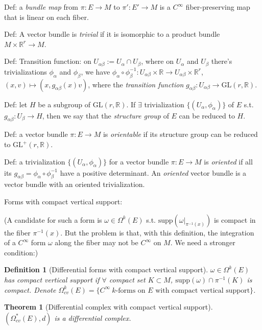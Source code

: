 \documentclass{article}
\theoremstyle{mystyle}
\newtheorem*{definition}{Definition}%
\newtheorem*{theorem*}{Theorem}
\theoremstyle{remark}
\numberwithin{equation}{section}
\begin{document}
Def: a \emph{bundle map} from $\pi\colon E\rightarrow M$ to $\pi'\colon E'\rightarrow M$ is a $C^\infty$ fiber-preserving map that is linear on each fiber.

Def: A vector bundle is \emph{trivial} if it is isomorphic to a product bundle $M\times \mathbb{R}^r\rightarrow M$.

Def: Transition function: on $U_{\alpha\beta} := U_\alpha\cap U_\beta$, where on $U_\alpha$ and $U_\beta$ there's trivializations $\phi_\alpha$ and $\phi_\beta$, we have $\phi_\alpha \circ \phi_\beta^{-1}\colon U_{\alpha\beta}\times \mathbb{R}\rightarrow U_{\alpha\beta} \times \mathbb{R}^r$, $(x,v)\mapsto (x,g_{\alpha\beta}(x)v)$, where the \emph{transition function} $g_{\alpha\beta}\colon U_{\alpha\beta}\rightarrow \mathrm{GL}(r,\mathbb{R})$.

Def: let $H$ be a subgroup of $\mathrm{GL}(r,\mathbb{R})$. If $\exists$ trivialization $\{(U_\alpha,\phi_\alpha)\}$ of $E$ s.t. $g_{\alpha\beta}\colon U_\beta\rightarrow H$, then we say that the \emph{structure group} of $E$ can be reduced to $H$.

Def: a vector bundle $\pi\colon E\rightarrow M$ is \emph{orientable} if its structure group can be reduced to $\mathrm{GL}^+(r,\mathbb{R})$. 

Def: a trivialization $\{(U_\alpha,\phi_\alpha)\}$ for a vector bundle $\pi\colon E\rightarrow M$ is \emph{oriented} if all its $g_{\alpha\beta} = \phi_\alpha \circ \phi_\beta^{-1}$ have a positive determinant. An \emph{oriented} vector bundle is a vector bundle with an oriented trivialization.

Forms with compact vertical support:

(A candidate for such a form is $\omega \in \Omega^k(E)$ s.t. $\text{supp}(\omega|_{\pi^{-1}(x)})$ is compact in the fiber $\pi^{-1}(x)$. But the problem is that, with this definition, the integration of a $C^\infty$ form $\omega$ along the fiber may not be $C^\infty$ on $M$. We need a stronger condition:)

\begin{definition}[Differential forms with compact vertical support] $\omega \in \Omega^k(E)$ has \emph{compact vertical support} if $\forall$ compact set $K\subset M$, $\text{supp}(\omega)\cap \pi^{-1}(K)$ is compact. Denote $\Omega^k_{cv}(E) = \{C^\infty~k\text{-forms on }E\text{ with compact vertical support}\}$.
\end{definition}

\begin{theorem*}[Differential complex with compact vertical support] $(\Omega^*_{cv}(E),d)$ is a differential complex.
\end{theorem*}
\end{document}
